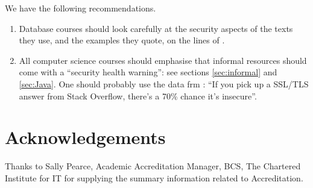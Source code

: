 \documentclass[sigconf,anonymous]{acmart}
\begin{document}
We have the following recommendations.
\begin{enumerate}
\item Database courses should look carefully at the security aspects of the texts they use, and the examples they quote, on the lines of \cite{Drop2019}.
\item All computer science courses should emphasise that informal resources should come with a ``security health warning'': see sections \ref{sec:informal} and \ref{sec:Java}. One should probably use the data frm \cite{Chenetal2019a}: ``If you pick up a SSL/TLS answer from Stack Overflow, there's a 70\% chance it's insecure''.
\end{enumerate}

\section*{Acknowledgements}
Thanks to Sally Pearce, Academic Accreditation Manager, BCS, The Chartered Institute for IT for supplying the summary information related to Accreditation.


 
\end{document}

